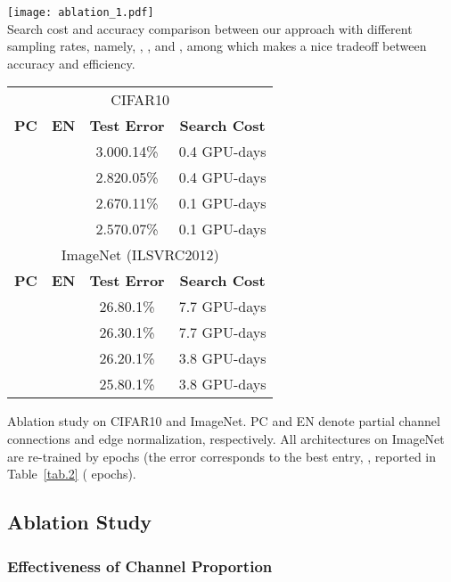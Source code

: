 \documentclass{article} \usepackage{iclr2020_conference,times}
\newcommand{\cmark}{\ding{51}}\newcommand{\xmark}{\ding{55}}\usepackage[misc]{ifsym}
\begin{document}
\makeatletter{}\makeatother
\begin{minipage}{.45\textwidth}
\centering
\vspace{0.2cm}
\texttt{[image: ablation\_1.pdf]}\\
\caption{Search cost and accuracy comparison between our approach with different sampling rates, namely, , ,  and , among which  makes a nice tradeoff between accuracy and efficiency.}
\label{fig:sampling}
\end{minipage}
\makeatletter{}\makeatother
\hfill
\begin{minipage}{.5\textwidth}
\centering
\small
\begin{tabular}{cccc}
\hline
\multicolumn{4}{c}{CIFAR10}\\
\textbf{PC}&\textbf{EN} & \textbf{Test Error} &\textbf{Search Cost}\\
\hline
\xmark& \xmark& 3.000.14\%& 0.4 GPU-days\\
\xmark& \cmark& 2.820.05\%& 0.4 GPU-days\\
\cmark& \xmark& 2.670.11\%& 0.1 GPU-days\\
\cmark& \cmark& 2.570.07\%& 0.1 GPU-days\\
\hline
\hline
\multicolumn{4}{c}{ImageNet (ILSVRC2012)}\\
\textbf{PC}&\textbf{EN} & \textbf{Test Error} &\textbf{Search Cost}\\
\hline
\xmark& \xmark& 26.80.1\%& 7.7 GPU-days\\
\xmark& \cmark& 26.30.1\%& 7.7 GPU-days\\
\cmark& \xmark& 26.20.1\%& 3.8 GPU-days\\
\cmark& \cmark& 25.80.1\%& 3.8 GPU-days\\
\hline			
\end{tabular}
\caption{Ablation study on CIFAR10 and ImageNet. PC and EN denote partial channel connections and edge normalization, respectively. All architectures on ImageNet are re-trained by  epochs (the  error corresponds to the best entry, , reported in Table~\ref{tab.2} ( epochs).}
\label{tab:components}
\end{minipage}

\subsection{Ablation Study}
\label{Experiments:Ablation}

\subsubsection{Effectiveness of Channel Proportion }
\label{Experiments:Ablation:Sampling}
\end{document}
